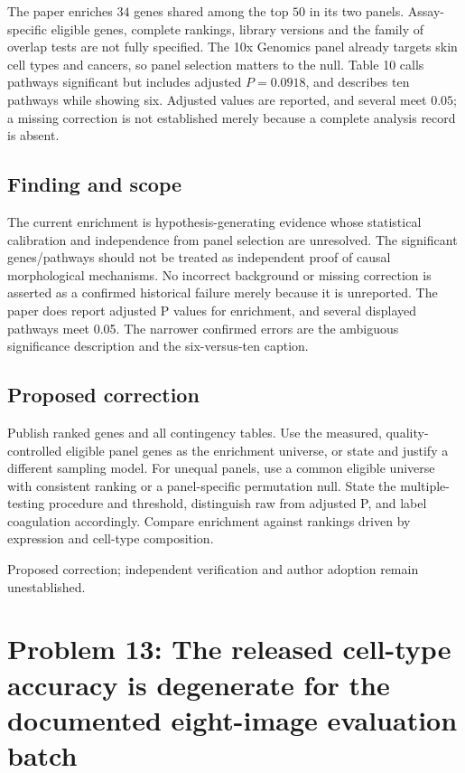 \documentclass[11pt]{article}
\begin{document}
The paper enriches \(34\) genes shared among the top \(50\) in its two panels. Assay-specific eligible genes, complete rankings, library versions and the family of overlap tests are not fully specified. The 10x Genomics panel already targets skin cell types and cancers, so panel selection matters to the null. Table 10 calls pathways significant but includes adjusted \(P=0.0918\), and describes ten pathways while showing six. Adjusted values are reported, and several meet \(0.05\); a missing correction is not established merely because a complete analysis record is absent.

\subsection*{Finding and scope}

The current enrichment is hypothesis-generating evidence whose statistical calibration and independence from panel selection are unresolved. The significant genes/pathways should not be treated as independent proof of causal morphological mechanisms. No incorrect background or missing correction is asserted as a confirmed historical failure merely because it is unreported. The paper does report adjusted P values for enrichment, and several displayed pathways meet 0.05. The narrower confirmed errors are the ambiguous significance description and the six-versus-ten caption.

\subsection*{Proposed correction}

Publish ranked genes and all contingency tables. Use the measured, quality-controlled eligible panel genes as the enrichment universe, or state and justify a different sampling model. For unequal panels, use a common eligible universe with consistent ranking or a panel-specific permutation null. State the multiple-testing procedure and threshold, distinguish raw from adjusted P, and label coagulation accordingly. Compare enrichment against rankings driven by expression and cell-type composition.

Proposed correction; independent verification and author adoption remain unestablished.

\section*{Problem 13: The released cell-type accuracy is degenerate for the documented eight-image evaluation batch}
\end{document}
